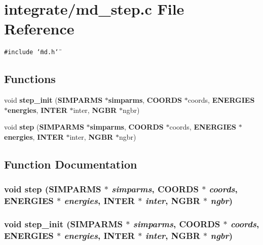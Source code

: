\section{integrate/md\_\-step.c File Reference}
\label{integrate_2md__step_8c}
{\tt \#include \char`\"{}md.h\char`\"{}}\par
\subsection*{Functions}
\begin{CompactItemize}
\item 
void {\bf step\_\-init} ({\bf SIMPARMS} $\ast${\bf simparms}, {\bf COORDS} $\ast$coords, {\bf ENERGIES} $\ast${\bf energies}, {\bf INTER} $\ast$inter, {\bf NGBR} $\ast$ngbr)
\item 
void {\bf step} ({\bf SIMPARMS} $\ast${\bf simparms}, {\bf COORDS} $\ast$coords, {\bf ENERGIES} $\ast${\bf energies}, {\bf INTER} $\ast$inter, {\bf NGBR} $\ast$ngbr)
\end{CompactItemize}


\subsection{Function Documentation}
\subsubsection{\setlength{\rightskip}{0pt plus 5cm}void step ({\bf SIMPARMS} $\ast$ {\em simparms}, {\bf COORDS} $\ast$ {\em coords}, {\bf ENERGIES} $\ast$ {\em energies}, {\bf INTER} $\ast$ {\em inter}, {\bf NGBR} $\ast$ {\em ngbr})}\label{integrate_2md__step_8c_2405c06531eef5b1c503a751e872f78f}


\subsubsection{\setlength{\rightskip}{0pt plus 5cm}void step\_\-init ({\bf SIMPARMS} $\ast$ {\em simparms}, {\bf COORDS} $\ast$ {\em coords}, {\bf ENERGIES} $\ast$ {\em energies}, {\bf INTER} $\ast$ {\em inter}, {\bf NGBR} $\ast$ {\em ngbr})}\label{integrate_2md__step_8c_890abff59693b4be532456eecd2eeb0b}


